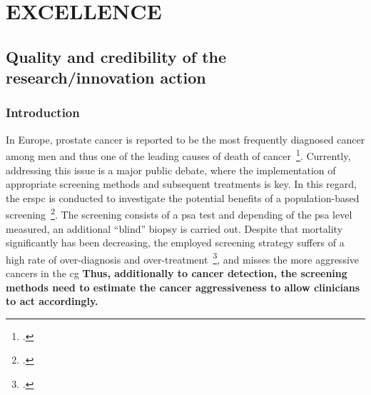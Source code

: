 \section{EXCELLENCE}
\label{sec:excellence}

\subsection{Quality and credibility of the research/innovation action}
\label{sec:quality}

\subsubsection{Introduction}
\label{sec:introduction}

In Europe, prostate cancer is reported to be the most frequently diagnosed cancer among men and thus one of the leading causes of death of cancer~\footcite{Ferlay2013}. 
Currently, addressing this issue is a major public debate, where the implementation of appropriate screening methods and subsequent treatments is key.
In this regard, the \ac{erspc} is conducted to investigate the potential benefits of a population-based screening~\footcite{Schroder2015}. 
The screening consists of a \ac{psa} test and depending of the \ac{psa} level measured, an additional ``blind'' biopsy is carried out. 
Despite that mortality significantly has been decreasing, the employed screening strategy suffers of a high rate of over-diagnosis and over-treatment~\footcite{Delpierre2013}, and misses the more aggressive cancers in the \ac{cg}%
\textbf{Thus, additionally to cancer detection, the screening methods need to estimate the cancer aggressiveness to allow clinicians to act accordingly.}


